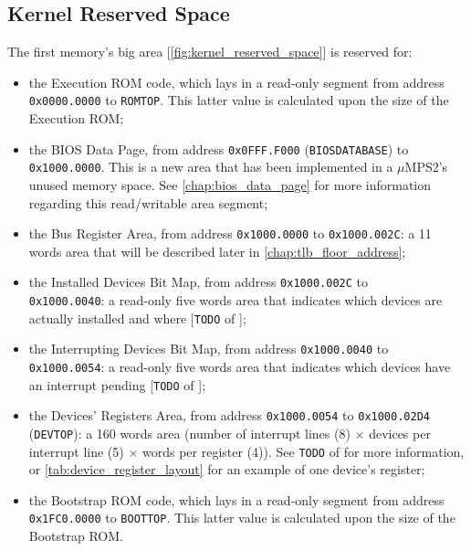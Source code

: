 \documentclass[12pt,a4paper,openright,twoside]{report}
\begin{document}
\subsection{Kernel Reserved Space}
\label{chap:kernel_reserved_space}
The first memory's big area [\autoref{fig:kernel_reserved_space}] is reserved for:
\begin{itemize}
	\item the Execution ROM code, which lays in a read-only segment from address \texttt{0x0000.0000} to \texttt{ROMTOP}. This latter value is calculated upon the size of the Execution ROM;
	\item the BIOS Data Page, from address \texttt{0x0FFF.F000} (\texttt{BIOSDATABASE}) to \texttt{0x1000.0000}. This is a new area that has been implemented in a $\mu$MPS2's unused memory space.
	      See \autoref{chap:bios_data_page} for more information regarding this read/writable area segment;
	\item the Bus Register Area, from address \texttt{0x1000.0000} to \texttt{0x1000.002C}: a 11 words area that will be described later in \autoref{chap:tlb_floor_address};
	\item the Installed Devices Bit Map, from address \texttt{0x1000.002C} to \\ \texttt{0x1000.0040}: a read-only five words area that indicates which devices are actually installed and where [\texttt{TODO} of \cite{pops}];
	\item the Interrupting Devices Bit Map, from address \texttt{0x1000.0040} to \\ \texttt{0x1000.0054}: a read-only five words area that indicates which devices have an interrupt pending [\texttt{TODO} of \cite{pops}];
	\item the Devices' Registers Area, from address \texttt{0x1000.0054} to \texttt{0x1000.02D4} (\texttt{DEVTOP}): a 160 words area (number of interrupt lines (8) $\times$ devices per interrupt line (5) $\times$  words per register (4)). See \texttt{TODO} of \cite{pops} for more information, or \autoref{tab:device_register_layout} for an example of one device's register;
	\item the Bootstrap ROM code, which lays in a read-only segment from address \texttt{0x1FC0.0000} to \texttt{BOOTTOP}. This latter value is calculated upon the size of the Bootstrap ROM.
\end{itemize}
\end{document}
